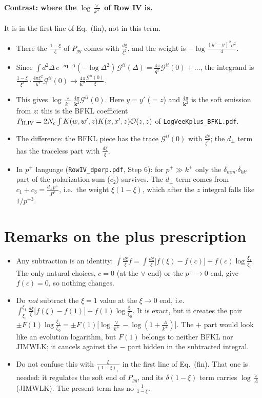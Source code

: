 \documentclass[10pt]{article}
\numberwithin{equation}{section}
\newcommand{\OO}{\mathcal O}
\newcommand{\GG}{\mathcal G}
\begin{document}
\paragraph{Contrast: where the $\log\frac{\vee}{k^+}$ of Row IV is.} It is in the first line of Eq.~(fin), not in this term.
\begin{itemize}
\item There the $\frac{1-\xi}{\xi}$ of $P_{gg}$ comes with $\frac{d\xi}{\xi^2}$, and the weight is $-\log\frac{(y'-y)^2\mu^2}{4}$.
\item Since $\int d^2\Delta\,e^{-i\mathbf q\cdot\Delta}(-\log\Delta^2)\,\GG^{ii}(\Delta)=\frac{4\pi}{q^2}\GG^{ii}(0)+\dots$, the integrand is $\frac{1-\xi}{\xi^3}\cdot\frac{4\pi\xi^2}{\mathbf k^2}\GG^{ii}(0)\to\frac{4\pi}{\mathbf k^2}\frac{\GG^{ii}(0)}{\xi}$.
\item This gives $\log\frac{\vee}{k^+}\,\frac{4\pi}{\mathbf k^2}\GG^{ii}(0)$. Here $y=y'$ ($=z$) and $\frac{4\pi}{\mathbf k^2}$ is the soft emission from $z$: this is the BFKL coefficient $P_{\rm II.IV}=2N_c\int K(w,w',z)K(x,x',z)\OO(z,z)$ of \texttt{LogVeeKplus\_BFKL.pdf}.
\item The difference: the BFKL piece has the trace $\GG^{ii}(0)$ with $\frac{d\xi}{\xi^3}$; the $d_\perp$ term has the traceless part with $\frac{d\xi}{\xi}$.
\item In $p^+$ language (\texttt{RowIV\_dperp.pdf}, Step 6): for $p^+\gg k^+$ only the $\delta_{mm'}\delta_{kk'}$ part of the polarization sum ($c_2$) survives. The $d_\perp$ term comes from $c_1+c_3=\frac{d_\perp p^+}{P^2}$, i.e.\ the weight $\xi(1-\xi)$, which after the $z$ integral falls like $1/p^{+3}$.
\end{itemize}

\section{Remarks on the plus prescription}\label{sec:remarks}
\begin{itemize}
\item Any subtraction is an identity: $\int\frac{d\xi}{\xi}f=\int\frac{d\xi}{\xi}\big[f(\xi)-f(c)\big]+f(c)\log\frac{\xi_1}{\xi_0}$. The only natural choices, $c=0$ (at the $\vee$ end) or the $p^+\to0$ end, give $f(c)=0$, so nothing changes.
\item Do \emph{not} subtract the $\xi=1$ value at the $\xi\to0$ end, i.e.\ $\int_{\xi_0}^{\xi_1}\frac{d\xi}{\xi}\big[f(\xi)-f(1)\big]+f(1)\log\frac{\xi_1}{\xi_0}$. It is exact, but it creates the pair $\pm F(1)\log\frac{\xi_1}{\xi_0}=\pm F(1)\big[\log\frac{\vee}{k^+}-\log(1+\frac{\Lambda}{k^+})\big]$. The $+$ part would look like an evolution logarithm, but $F(1)$ belongs to neither BFKL nor JIMWLK; it cancels against the $-$ part hidden in the subtracted integral.
\item Do not confuse this with $\frac{\xi}{(1-\xi)_+}$ in the first line of Eq.~(fin). That one is needed: it regulates the soft end of $P_{gg}$, and its $\delta(1-\xi)$ term carries $\log\frac{\vee}{\Lambda}$ (JIMWLK). The present term has no $\frac{1}{1-\xi}$.
\end{itemize}
\end{document}

